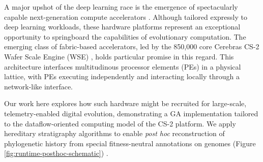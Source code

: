 A major upshot of the deep learning race is the emergence of spectacularly capable next-generation compute accelerators \citep{zhang2016cambricon,emani2021accelerating,jia2019dissecting,medina2020habana}.
Although tailored expressly to deep learning workloads, these hardware platforms represent an exceptional opportunity to springboard the capabilities of evolutionary computation.
The emerging class of fabric-based accelerators, led by the 850,000 core Cerebras CS-2 Wafer Scale Engine (WSE) \citep{lauterbach2021path}, holds particular promise in this regard.
This architecture interfaces multitudinous processor elements (PEs) in a physical lattice, with PEs executing independently and interacting locally through a network-like interface.

Our work here explores how such hardware might be recruited for large-scale, telemetry-enabled digital evolution, demonstrating a GA implementation tailored to the dataflow-oriented computing model of the CS-2 platform.
We apply hereditary stratigraphy algorithms to enable \textit{post hoc} reconstruction of phylogenetic history from special fitness-neutral annotations on genomes (Figure \ref{fig:runtime-posthoc-schematic}) \citep{moreno2022hereditary} .




